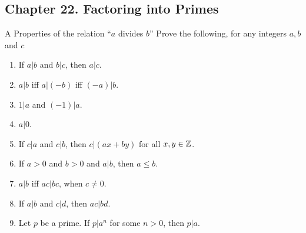 \subsection*{Chapter 22. Factoring into Primes}


\begin{exercise}{A Properties of the relation ``$a$ divides $b$''}
Prove the following, for any integers $a,b$ and $c$
\begin{enumerate}
    \item If $a\vert b$ and $b\vert c$, then $a\vert c$.
    \item $a\vert b$ iff $a\vert (-b)$ iff $(-a)\vert b$.
    \item $1\vert a$ and $(-1)\vert a$.
    \item $a\vert 0$.
    \item If $c\vert a$ and $c\vert b$, then $c\vert (ax+by)$ for all $x,y\in \mathbb{Z}$.
    \item If $a>0$ and $b>0$ and $a\vert b$, then $a\leq b$.
    \item $a\vert b$ iff $ac\vert bc$, when $c\neq 0$.
    \item If $a\vert b$ and $c\vert d$, then $ac\vert bd$.
    \item Let $p$ be a prime. If $p\vert a^{n}$ for some $n>0$, then $p\vert a$.
\end{enumerate}
\end{exercise}

